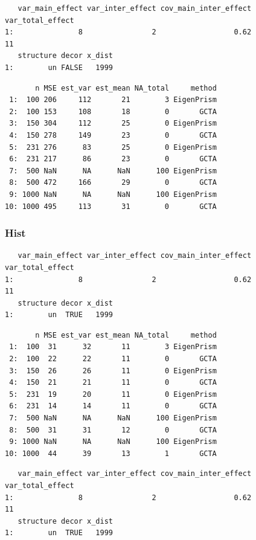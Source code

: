 \documentclass[]{article}
\begin{document}
\begin{verbatim}
   var_main_effect var_inter_effect cov_main_inter_effect var_total_effect
1:               8                2                  0.62               11
   structure decor x_dist
1:        un FALSE   1999
\end{verbatim}

\begin{verbatim}
       n MSE est_var est_mean NA_total     method
 1:  100 206     112       21        3 EigenPrism
 2:  100 153     108       18        0       GCTA
 3:  150 304     112       25        0 EigenPrism
 4:  150 278     149       23        0       GCTA
 5:  231 276      83       25        0 EigenPrism
 6:  231 217      86       23        0       GCTA
 7:  500 NaN      NA      NaN      100 EigenPrism
 8:  500 472     166       29        0       GCTA
 9: 1000 NaN      NA      NaN      100 EigenPrism
10: 1000 495     113       31        0       GCTA
\end{verbatim}

\subsubsection{Hist}\label{hist}

\begin{verbatim}
   var_main_effect var_inter_effect cov_main_inter_effect var_total_effect
1:               8                2                  0.62               11
   structure decor x_dist
1:        un  TRUE   1999
\end{verbatim}

\begin{verbatim}
       n MSE est_var est_mean NA_total     method
 1:  100  31      32       11        3 EigenPrism
 2:  100  22      22       11        0       GCTA
 3:  150  26      26       11        0 EigenPrism
 4:  150  21      21       11        0       GCTA
 5:  231  19      20       11        0 EigenPrism
 6:  231  14      14       11        0       GCTA
 7:  500 NaN      NA      NaN      100 EigenPrism
 8:  500  31      31       12        0       GCTA
 9: 1000 NaN      NA      NaN      100 EigenPrism
10: 1000  44      39       13        1       GCTA
\end{verbatim}

\begin{verbatim}
   var_main_effect var_inter_effect cov_main_inter_effect var_total_effect
1:               8                2                  0.62               11
   structure decor x_dist
1:        un  TRUE   1999
\end{verbatim}
\end{document}
